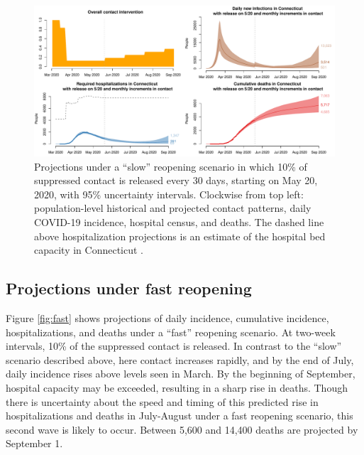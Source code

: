 \documentclass[11pt]{article}
\begin{document}
\begin{figure}
\centering
\includegraphics[width=\textwidth]{figures/slow.pdf}
\caption{Projections under a ``slow'' reopening scenario in which 10\% of suppressed contact is released every 30 days, starting on May 20, 2020, with 95\% uncertainty intervals. Clockwise from top left: population-level historical and projected contact patterns, daily COVID-19 incidence, hospital census, and deaths. The dashed line above hospitalization projections is an estimate of the hospital bed capacity in Connecticut \citep{CHAwebsite}. }

\label{fig:slow}
\end{figure}



\subsection*{Projections under fast reopening} 

Figure \ref{fig:fast} shows projections of daily incidence, cumulative incidence, hospitalizations, and deaths under a ``fast'' reopening scenario. At two-week intervals, 10\% of the suppressed contact is released.   In contrast to the ``slow'' scenario described above, here contact increases rapidly, and by the end of July, daily incidence rises above levels seen in March.  By the beginning of September, hospital capacity may be exceeded, resulting in a sharp rise in deaths.  Though there is uncertainty about the speed and timing of this predicted rise in hospitalizations and deaths in July-August under a fast reopening scenario, this second wave is likely to occur. Between 5,600 and 14,400 deaths are projected by September 1.  
\end{document}
